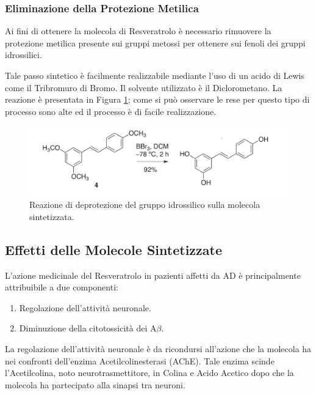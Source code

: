 \documentclass[a4paper, 12pt]{article}
\begin{document}
\subsubsection{Eliminazione della Protezione Metilica}
Ai fini di ottenere la molecola di Resveratrolo è necessario rimuovere la protezione metilica presente sui gruppi metossi per ottenere sui fenoli dei gruppi idrossilici.

Tale passo sintetico è facilmente realizzabile mediante l'uso di un acido di Lewis come il Tribromuro di Bromo. Il solvente utilizzato è il Diclorometano.
La reazione è presentata in Figura \ref{fig:deprot_resveratrolo}; come si può osservare le rese per questo tipo di processo sono alte ed il processo è di facile realizzazione. \cite{alejandro_v._martinez_expedient_2017}

\begin{figure}[H]
	\centering
	\includegraphics[width=\linewidth]{immagini/deprot_resveratrolo.png}
	\caption{Reazione di deprotezione del gruppo idrossilico sulla molecola sintetizzata.}
	\label{fig:deprot_resveratrolo}
\end{figure}

\subsection{Effetti delle Molecole Sintetizzate}
\label{effetti_resveratrolo}
L'azione medicinale del Resveratrolo in pazienti affetti da AD è principalmente attribuibile a due componenti:

\begin{enumerate}
	\item Regolazione dell'attività neuronale.
	\item Diminuzione della citotossicità dei A$\beta$.
\end{enumerate}

La regolazione dell'attività neuronale è da ricondursi all'azione che la molecola ha nei confronti dell'enzima Acetilcolinesterasi (AChE). Tale enzima scinde l'Acetilcolina, noto neurotrasmettitore, in Colina e Acido Acetico dopo che la molecola ha partecipato alla sinapsi tra neuroni.
\end{document}
